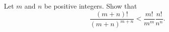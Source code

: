 Let $m$ and $n$ be positive integers.  Show that
\[
\frac{(m+n)!}{(m+n)^{m+n}}
< \frac{m!}{m^m} \frac{n!}{n^n}.
\]
